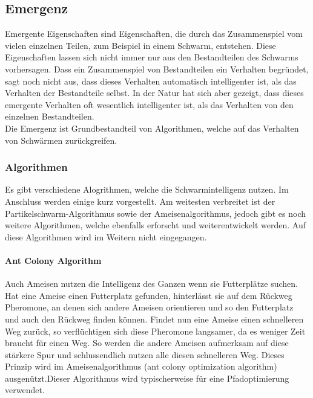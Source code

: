 		\subsection{Emergenz}
		Emergente Eigenschaften sind Eigenschaften, die durch das Zusammenspiel vom vielen einzelnen Teilen, zum Beispiel in einem Schwarm, entstehen. Diese Eigenschaften lassen sich nicht immer nur aus den Bestandteilen des Schwarms vorhersagen.
		Dass ein Zusammenspiel von Bestandteilen ein Verhalten begründet, sagt noch nicht aus, dass dieses Verhalten automatisch intelligenter ist, als das Verhalten der Bestandteile selbst. In der Natur hat sich aber gezeigt, dass dieses emergente Verhalten oft wesentlich intelligenter ist, als das Verhalten von den einzelnen Bestandteilen. \\
		
		Die Emergenz ist Grundbestandteil von Algorithmen, welche auf das Verhalten von Schwärmen zurückgreifen.\cite{melchior-bsc}
		
		
				
		\subsubsection{Algorithmen}
		Es gibt verschiedene Alogrithmen, welche die Schwarmintelligenz nutzen. Im Anschluss werden einige kurz vorgestellt. Am weitesten verbreitet ist der Partikelschwarm-Algorithmus sowie der Ameisenalgorithmus, jedoch gibt es noch weitere Algorithmen, welche ebenfalls erforscht und weiterentwickelt werden. Auf diese Algorithmen wird im Weitern nicht eingegangen.\cite{uulm}
		
		\paragraph{Ant Colony Algorithm}
		$\;$ \\
		Auch Ameisen nutzen die Intelligenz des Ganzen wenn sie Futterplätze suchen. Hat eine Ameise einen Futterplatz gefunden, hinterlässt sie auf dem Rückweg Pheromone, an denen sich andere Ameisen orientieren und so den Futterplatz und auch den Rückweg finden können. Findet nun eine Ameise einen schnelleren Weg zurück, so verflüchtigen sich diese Pheromone langsamer, da es weniger Zeit braucht für einen Weg. So werden die andere Ameisen aufmerksam auf diese stärkere Spur und schlussendlich nutzen alle diesen schnelleren Weg. Dieses Prinzip wird im Ameisenalgorithmus (ant colony optimization algorithm) ausgenützt.Dieser Algorithmus wird typischerweise für eine Pfadoptimierung verwendet.
		
